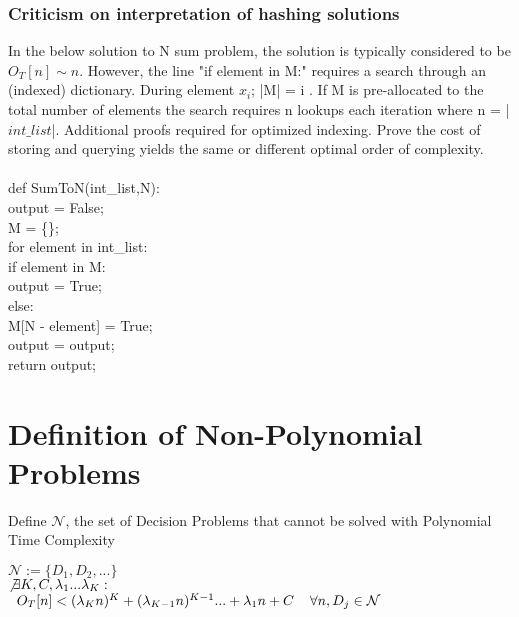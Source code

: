 \documentclass[11pt]{article}
\begin{document}
\subsubsection{Criticism on interpretation of hashing solutions}
In the below solution to N sum problem, the solution is typically considered to be $O_T[n] \sim n$. However, the line "if element in M:" 
requires a search through an (indexed) dictionary. During element $x_i$; |M| = i . If M is pre-allocated to the total number of elements the search requires n lookups each iteration
where n = |$int\_list$|. Additional proofs required for optimized indexing. Prove the cost of storing and querying yields the same or different optimal order of complexity.\\
\\
def SumToN(int\_list,N): \\
output = False;\\
M = \{\}; \\
for element in int\_list: \\
if element in M:\\
output = True;\\
else:\\
M[N - element] = True;\\
output = output;\\
return output;














\newpage
\section{Definition of Non-Polynomial Problems}
Define $\mathcal{N}$, the set of Decision Problems that cannot be solved with Polynomial Time Complexity
\begin{center}
$
\mathcal{N} := \{ D_1,D_2,...\} 
$
\\
$ 
\not \exists K,C,\lambda_1...\lambda_K : \hspace{2mm}
$
\\
$
\hspace{2mm} O_T[n] < (\lambda_K n)^K + (\lambda_{K-1} n)^{K-1}... + \lambda_1 n + C \hspace{4mm} \forall n, D_j \in \mathcal{N}
$
\end{center}
\end{document}
